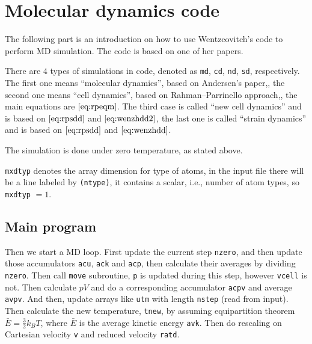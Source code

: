 
\section{Molecular dynamics code}

The following part is an introduction on how to use
Wentzcovitch's code to perform MD simulation. The code is
based on one of her papers.\cite{Wentzcovitch:1991ka}

There are $4$ types of simulations in code,
denoted as \texttt{md}, \texttt{cd}, \texttt{nd}, \texttt{sd},
respectively. The first one means ``molecular dynamics'',
based on Andersen's paper,\cite{Andersen:1980ew},
the second one means ``cell dynamics'', based on
Rahman–Parrinello approach,\cite{Parrinello:1980kx},
the main equations are $\eqref{eq:rpeqm}$.
The third case is called ``new cell dynamics'' and is based on
$\eqref{eq:rpsdd}$ and $\eqref{eq:wenzhdd2}$,
the last one is called ``strain dynamics'' and is based on
$\eqref{eq:rpsdd}$ and $\eqref{eq:wenzhdd}$.

The simulation is done under zero temperature, as stated above.

\texttt{mxdtyp} denotes the array dimension for type of atoms,
in the input file there will be a line labeled by \texttt{(ntype)}, it
contains a scalar, i.e., number of atom types, so \texttt{mxdtyp} $=1$.

\subsection{Main program}

Then we start a MD loop.
First update the current step \texttt{nzero}, and then update those
accumulators \texttt{acu}, \texttt{ack} and \texttt{acp}, then calculate
their averages by dividing \texttt{nzero}. Then call \texttt{move} subroutine,
\texttt{p} is updated during this step, however \texttt{vcell} is not.
Then calculate $p V$ and do a corresponding accumulator \texttt{acpv} and
average \texttt{avpv}. And then, update arrays like \texttt{utm} with length
\texttt{nstep} (read from input). 
Then calculate the new temperature, \texttt{tnew}, by assuming equipartition 
theorem $\bar{E} = \frac{ 3 }{ 2 } k_B T$, where $\bar{E}$ is
the average kinetic energy \texttt{avk}.
Then do rescaling on Cartesian velocity \texttt{v} and reduced velocity
\texttt{ratd}.

